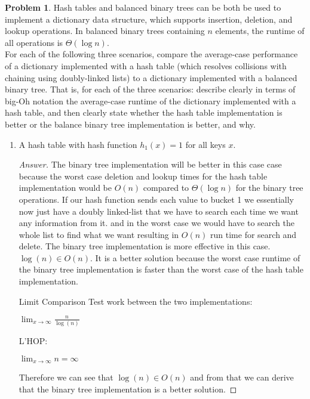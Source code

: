 \documentclass[11pt]{article}
\theoremstyle{definition}
\theoremstyle{definition}
\newtheorem{required}{Problem}
\theoremstyle{definition}
\begin{document}
\begin{required} \label{Hash3}
Hash tables and balanced binary trees can be both be used to implement a dictionary data structure, which supports insertion, deletion, and lookup operations. In balanced binary trees containing $n$ elements, the runtime of all operations is $\Theta(\log n)$.  \\

\noindent For each of the following three scenarios, compare the average-case performance of a dictionary implemented with a hash table (which resolves collisions with chaining using doubly-linked lists) to a dictionary implemented with a balanced binary tree. That is, for each of the three scenarios: describe clearly in terms of big-Oh notation the average-case runtime of the dictionary implemented with a hash table, and then clearly state whether the hash table implementation is better or the balance binary tree implementation is better, and why.
	
\begin{enumerate}[label=(\alph*)]
\item A hash table with hash function $h_1(x)=1$ for all keys $x$.

\begin{proof}[Answer]

The binary tree implementation will be better in this case case because the worst case deletion and lookup times for the hash table implementation would be $O(n)$ compared to $\Theta(\log n)$ for the binary tree operations. If our hash function sends each value to bucket 1 we essentially now just have a doubly linked-list that we have to search each time we want any information from it. and in the worst case we would have to search the whole list to find what we want resulting in $O(n)$ run time for search and delete. The binary tree implementation is more effective in this case. $\log(n) \in O(n)$. It is a better solution because the worst case runtime of the binary tree implementation is faster than the worst case of the hash table implementation. 

Limit Comparison Test work between the two implementations:

$\lim_{x\to\infty} \frac{n}{\log(n)} $

L'HOP:

$\lim_{x\to\infty} n = \infty $

Therefore we can see that $\log(n) \in O(n)$ and from that we can derive that the binary tree implementation is a better solution. 


\end{proof}
\end{enumerate}
\end{required}
\end{document}
